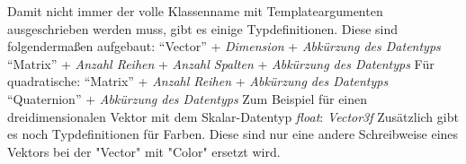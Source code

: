 Damit nicht immer der volle Klassenname mit Templateargumenten ausgeschrieben werden muss, gibt es einige Typdefinitionen. Diese sind folgendermaßen aufgebaut:
\newline"`Vector"' + \textit{Dimension} + \textit{Abkürzung des Datentyps}
\newline"`Matrix"' + \textit{Anzahl Reihen} + \textit{Anzahl Spalten} + \textit{Abkürzung des Datentyps}
\newline Für quadratische: "`Matrix"' + \textit{Anzahl Reihen} + \textit{Abkürzung des Datentyps}
\newline"`Quaternion"' + \textit{Abkürzung des Datentyps}
\newline Zum Beispiel für einen dreidimensionalen Vektor mit dem Skalar-Datentyp \textit{float}: 
\newline\textit{Vector3f}
Zusätzlich gibt es noch Typdefinitionen für Farben. Diese sind nur eine andere Schreibweise eines Vektors bei der "Vector" mit "Color" ersetzt wird.